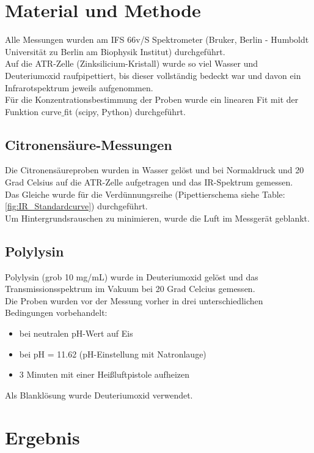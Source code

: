 \documentclass[10pt,a4paper]{article}
\begin{document}
	\section{Material und Methode}
	Alle Messungen wurden am IFS 66v/S Spektrometer (Bruker, Berlin - Humboldt Universität zu Berlin am Biophysik Institut) durchgeführt.\\
	Auf die ATR-Zelle (Zinksilicium-Kristall) wurde so viel Wasser und Deuteriumoxid raufpipettiert, bis dieser vollständig bedeckt war und davon ein Infrarotspektrum jeweils aufgenommen.\\
	Für die Konzentrationsbestimmung der Proben wurde ein linearen Fit mit der Funktion curve$\_$fit (scipy, Python) durchgeführt.\\
	
		\subsection{Citronensäure-Messungen}
		Die Citronensäureproben wurden in Wasser gelöst und bei Normaldruck und 20 Grad Celsius auf die ATR-Zelle aufgetragen und das IR-Spektrum gemessen.\\
		Das Gleiche wurde für die Verdünnungsreihe (Pipettierschema siehe Table: \ref{fig:IR_Standardcurve}) durchgeführt.\\
		Um Hintergrundsrauschen zu minimieren, wurde die Luft im Messgerät geblankt.\\
		
	
		\subsection{Polylysin}
		Polylysin (grob 10 mg/mL) wurde in Deuteriumoxid gelöst und das Transmissionsspektrum im Vakuum bei 20 Grad Celcius gemessen.\\
		Die Proben wurden vor der Messung vorher in drei unterschiedlichen Bedingungen vorbehandelt:
		\begin{itemize}
			\item bei neutralen pH-Wert auf Eis
			\item bei pH = 11.62 (pH-Einstellung mit Natronlauge)
			\item 3 Minuten mit einer Heißluftpistole aufheizen
		\end{itemize}
		Als Blanklösung wurde Deuteriumoxid verwendet.
	
	
	
	\section{Ergebnis}
\end{document}
